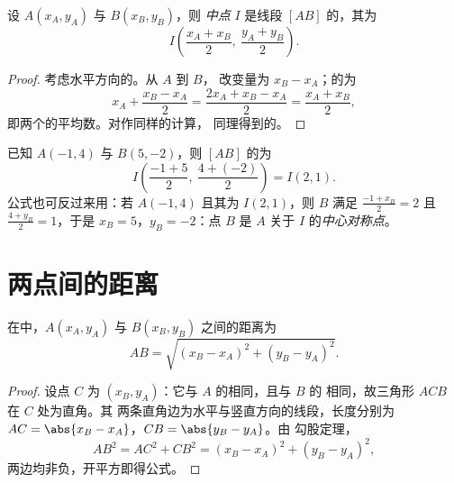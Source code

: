 \begin{proposition}[中点公式]\label{prop:g10:coordgeom:midpoint}
设 $A(x_A, y_A)$ 与 $B(x_B, y_B)$，则
\emph{中点} $I$ 是线段 $[AB]$ 的，其为
\[
I\left(\frac{x_A + x_B}{2},\ \frac{y_A + y_B}{2}\right).
\]
\end{proposition}

\begin{proof}
考虑水平方向的。从 $A$ 到 $B$，
改变量为 $x_B - x_A$；的为
\[
x_A + \frac{x_B - x_A}{2} = \frac{2x_A + x_B - x_A}{2}
= \frac{x_A + x_B}{2},
\]
即两个的平均数。对作同样的计算，
同理得到的。
\end{proof}

\begin{example}\label{ex:g10:coordgeom:midpoint}
已知 $A(-1, 4)$ 与 $B(5, -2)$，则 $[AB]$ 的为
\[
I\left(\frac{-1 + 5}{2},\ \frac{4 + (-2)}{2}\right) = I(2, 1).
\]
公式也可反过来用：若 $A(-1, 4)$ 且其为
$I(2, 1)$，则 $B$ 满足 $\frac{-1 + x_B}{2} = 2$ 且
$\frac{4 + y_B}{2} = 1$，于是 $x_B = 5$，$y_B = -2$：点 $B$ 是
$A$ 关于 $I$ 的\emph{中心对称点}。
\end{example}

\section{两点间的距离}

\begin{theorem}[距离公式]\label{thm:g10:coordgeom:distance}
在中，$A(x_A, y_A)$ 与
$B(x_B, y_B)$ 之间的距离为
\[
AB = \sqrt{(x_B - x_A)^2 + (y_B - y_A)^2}.
\]
\end{theorem}

\begin{proof}
设点 $C$ 为 $(x_B, y_A)$：它与 $A$ 的相同，且与 $B$ 的
相同，故三角形 $ACB$ 在 $C$ 处为直角。其
两条直角边为水平与竖直方向的线段，长度分别为
$AC = \abs{x_B - x_A}$，$CB = \abs{y_B - y_A}$。由
勾股定理，
\[
AB^2 = AC^2 + CB^2 = (x_B - x_A)^2 + (y_B - y_A)^2,
\]
两边均非负，开平方即得公式。
\end{proof}

